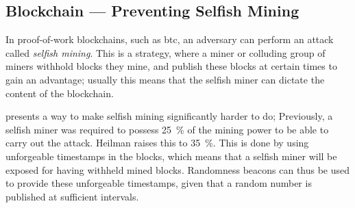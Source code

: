 \subsection{Blockchain --- Preventing Selfish Mining}\label{sub:blockchain_preventing_selfish_mining}
In proof-of-work blockchains, such as \gls{btc}, an adversary can perform an attack called \emph{selfish mining}.
This is a strategy, where a miner or colluding group of miners withhold blocks they mine, and publish these blocks at certain times to gain an advantage;
usually this means that the selfish miner can dictate the content of the blockchain.

\citet{heilman2014one} presents a way to make selfish mining significantly harder to do;
Previously, a selfish miner was required to possess 25~\% of the mining power to be able to carry out the attack. Heilman raises this to 35~\%.
This is done by using unforgeable timestamps in the blocks, which means that a selfish miner will be exposed for having withheld mined blocks.
Randomness beacons can thus be used to provide these unforgeable timestamps, given that a random number is published at sufficient intervals.
